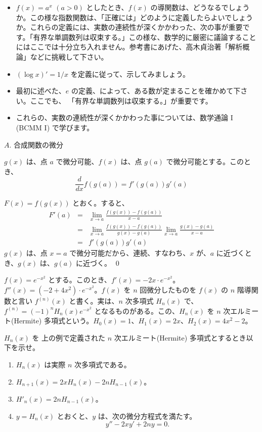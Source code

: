 \note
\begin{itemize}
\item $f(x) = a^x$ $(a > 0)$ としたとき、$f(x)$ の導関数は、どうなるでしょうか。この様な指数関数は、「正確には」どのように定義したらよいでしょうか。これらの定義には、実数の連続性が深くかかわった、次の事が重要です。「有界な単調数列は収束する。」この様な、数学的に厳密に議論することにはここでは十分立ち入れません。参考書にあげた、高木貞治著「解析概論」などに挑戦して下さい。
\item $(\log x)' = 1/x$ を定義に従って、示してみましょう。
\item 最初に述べた、$e$ の定義、によって、ある数が定まることを確かめて下さい。ここでも、
「有界な単調数列は収束する。」が重要です。
\item これらの、実数の連続性が深くかかわった事については、数学通論 I (BCMM I) で学びます。
\end{itemize}



\newpage
{}
$A$. 合成関数の微分
\begin{prop}
$g(x)$ は、点 $a$ で微分可能、$f(x)$ は、点 $g(a)$ で微分可能とする。このとき、
$$\frac{d}{dx}f(g(a)) = f'(g(a))g'(a)$$
\end{prop}
\proof
$F(x) = f(g(x))$ とおく。すると、
\begin{eqnarray*}
F'(a) & = & \lim_{x\rightarrow a}\frac{f(g(x)) - f(g(a))}{x-a}\\
        & = & \lim_{x\rightarrow a}\frac{f(g(x)) - f(g(a))}{g(x) - g(a)}\lim_{x\rightarrow a}\frac{g(x) - g(a)}{x-a}\\
        & = & f'(g(a))g'(a)
\end{eqnarray*}
$g(x)$ は、点 $x = a$ で微分可能だから、連続、すなわち、$x$ が、$a$ に近づくとき、$g(x)$  は、$g(a)$ に近づく。
\qed

\begin{eg}
$f(x) = e^{-x^2}$ とする。このとき、$f'(x) = -2x\cdot e^{-x^2}$。$f''(x) = (-2 + 4x^2)\cdot e^{-x^2}$。$f(x)$ を $n$ 回微分したものを $f(x)$ の $n$ 階導関数と言い $f^{(n)}(x)$ と書く。実は、$n$ 次多項式 $H_n(x)$ で、$f^{(n)} = (-1)^nH_n(x)e^{-x^2}$ となるものがある。この、$H_n(x)$ を $n$ 次エルミート(Hermite) 多項式という。$H_0(x) = 1$、$H_1(x) = 2x$、$H_2(x) = 4x^2 -2$。
\end{eg}

\begin{ex}
$H_n(x)$ を 上の例で定義された $n$ 次エルミート(Hermite) 多項式とするとき以下を示せ。
\begin{enumerate}
\item $H_n(x)$ は実際 $n$ 次多項式である。
\item $H_{n+1}(x) = 2xH_n(x) - 2nH_{n-1}(x)$。
\item $H'_n(x) = 2nH_{n-1}(x)$。
\item $y = H_n(x)$ とおくと、$y$ は、次の微分方程式を満たす。
$$y'' - 2xy' + 2ny = 0.$$
\end{enumerate}
\end{ex}

